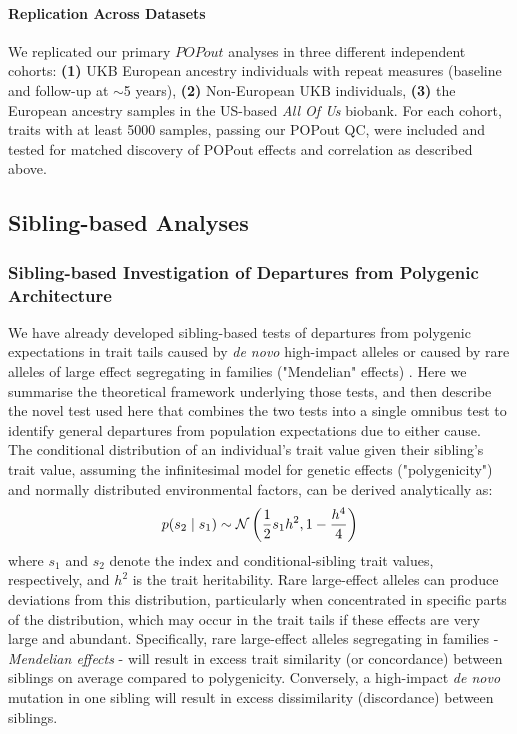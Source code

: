 \documentclass[12pt]{zHenriquesLab-StyleBioRxiv}
\begin{document}
\paragraph{Replication Across Datasets} 
We replicated our primary $POPout$ analyses in three different independent cohorts:  
\textbf{(1)} UKB European ancestry individuals with repeat measures (baseline and follow-up at $\sim$5 years), 
\textbf{(2)} Non-European UKB individuals, \textbf{(3)} the European ancestry samples in the 
US-based \emph{All Of Us} biobank. For each cohort, traits with at least 5000 samples, passing our POPout QC, 
were included and tested for matched discovery of POPout effects and correlation as described above. 
%
\subsection*{Sibling-based Analyses} \label{sec:methods:sibs}  
%
\subsubsection*{Sibling-based Investigation of Departures from Polygenic Architecture}
We have already developed sibling-based tests of departures from polygenic expectations in trait tails caused by \emph{de novo} high-impact alleles or caused by rare alleles of large effect segregating in families ("Mendelian" effects) \cite{Souaiaia2024}. Here we summarise the theoretical framework underlying those tests, and then describe the novel test used here that combines the two tests into a single omnibus test to identify general departures from population expectations due to either cause. \\
The conditional distribution of an individual's trait value given their sibling's trait value, assuming the infinitesimal model for genetic effects ("polygenicity") and normally distributed environmental factors, can be derived analytically \cite{Souaiaia2024} as:
%
\begin{equation} p(s_2 \mid s_1 ) \sim \mathcal{N}\left(\frac{1}{2}s_1h^2,
1-\frac{h^4}{4}\right) \label{math:S2givenS1}
\end{equation}
where $s_1$ and $s_2$ denote the index and conditional-sibling trait
values, respectively, and $h^2$ is the trait heritability. Rare
large-effect alleles can produce deviations from this distribution,
particularly when concentrated in specific parts of the distribution, 
which may occur in the trait tails if these effects are very large 
and abundant. Specifically, rare large-effect alleles segregating 
in families - {\em Mendelian effects} - will result in excess trait 
similarity (or concordance) between siblings on average compared
to polygenicity. Conversely, a high-impact {\em de novo} mutation in one
sibling will result in excess dissimilarity (discordance) between siblings.
\end{document}
